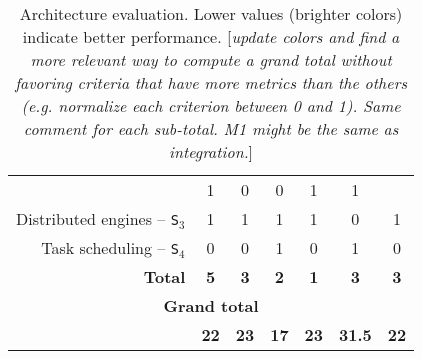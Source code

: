 \documentclass[preprint,3p,twocolumn]{elsarticle}
\newcommand{\todo}[1]{\color{blue}\xspace[\emph{#1}]\xspace\color{black}}
\begin{document}
\begin{table*}
\begin{tabular}{rcccccc}
                                     & \cellcolor[HTML]{99DD99}1
                                     & \cellcolor[HTML]{99FF99}0
                                     & \cellcolor[HTML]{99FF99}0
                                     & \cellcolor[HTML]{99DD99}1
                                     & \cellcolor[HTML]{99DD99}1 \\
Distributed engines -- \texttt{S$_3$}& \cellcolor[HTML]{99AA99}1
                                     & \cellcolor[HTML]{99AA99}1
                                     & \cellcolor[HTML]{99AA99}1
                                     & \cellcolor[HTML]{99AA99}1
                                     & \cellcolor[HTML]{99FF99}0
                                     & \cellcolor[HTML]{99AA99}1 \\
Task scheduling -- \texttt{S$_4$}    & \cellcolor[HTML]{99FF99}0
                                     & \cellcolor[HTML]{99FF99}0
                                     & \cellcolor[HTML]{99AA99}1
                                     & \cellcolor[HTML]{99FF99}0
                                     & \cellcolor[HTML]{99FF99}1
                                     & \cellcolor[HTML]{99FF99}0 \\
\textbf{Total}                       & \cellcolor[HTML]{99AA99}\textbf{5}
                                     & \cellcolor[HTML]{99BB99}\textbf{3}
                                     & \cellcolor[HTML]{99DD99}\textbf{2}
                                     & \cellcolor[HTML]{99FF99}\textbf{1}
                                     & \cellcolor[HTML]{99DD99}\textbf{3}
                                     & \cellcolor[HTML]{99BB99}\textbf{3} \\
\multicolumn{7}{c}{\cellcolor[HTML]{EEEEEE}\textbf{Grand total}}\\
                                     & \cellcolor[HTML]{99CC99}\textbf{22}
                                     & \cellcolor[HTML]{99BB99}\textbf{23}
                                     & \cellcolor[HTML]{99FF99}\textbf{17}
                                     & \cellcolor[HTML]{99CC99}\textbf{23}
                                     & \cellcolor[HTML]{99DD99}\textbf{31.5}
                                     & \cellcolor[HTML]{99AA99}\textbf{22}
\end{tabular}
\caption{Architecture evaluation. Lower values (brighter colors) indicate better performance. \todo{update colors and find a more relevant way to compute a grand total without favoring criteria that have more metrics than the others (e.g. normalize each criterion between 0 and 1). Same comment for each sub-total. M1 might be the same as integration.}}
\label{table:evaluation}
\end{table*}
\end{document}
